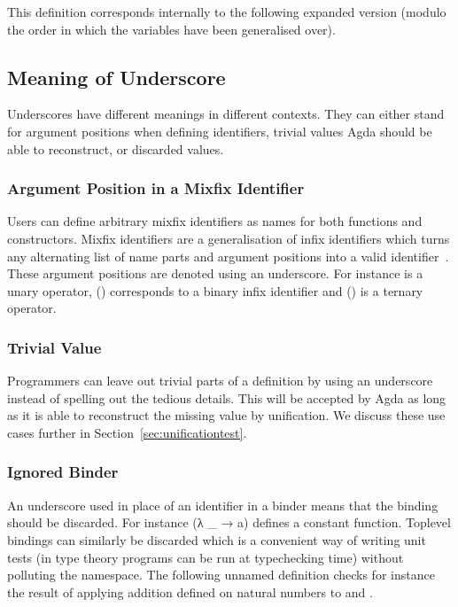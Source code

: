 
This definition corresponds internally to the following expanded
version (modulo the order in which the variables have been generalised
over).



\subsection{Meaning of Underscore}

Underscores have different meanings in different contexts. They can either stand
for argument positions when defining identifiers, trivial values Agda should be
able to reconstruct, or discarded values.

\subsubsection{Argument Position in a Mixfix Identifier}

Users can define arbitrary mixfix identifiers as names for both functions and
constructors. Mixfix identifiers are a generalisation of infix identifiers
which turns any alternating list of name parts and argument positions into a
valid identifier~\cite{DBLP:conf/ifl/DanielssonN08}. These argument positions
are denoted using an underscore. For instance  is a unary operator,
(\AIC{\_::\_}) corresponds to a binary infix identifier and () is a
ternary operator.

\subsubsection{Trivial Value}

Programmers can leave out trivial parts of a definition by using an underscore
instead of spelling out the tedious details. This will be accepted by Agda as
long as it is able to reconstruct the missing value by unification. We discuss
these use cases further in Section~\ref{sec:unificationtest}.

\subsubsection{Ignored Binder}

An underscore used in place of an identifier in a binder means that the binding
should be discarded. For instance {(λ \_ → a)} defines a constant function.
Toplevel bindings can similarly be discarded which is a convenient way of
writing unit tests (in type theory programs can be run at typechecking time)
without polluting the namespace. The following unnamed definition checks for
instance the result of applying addition defined on natural numbers to
 and .

